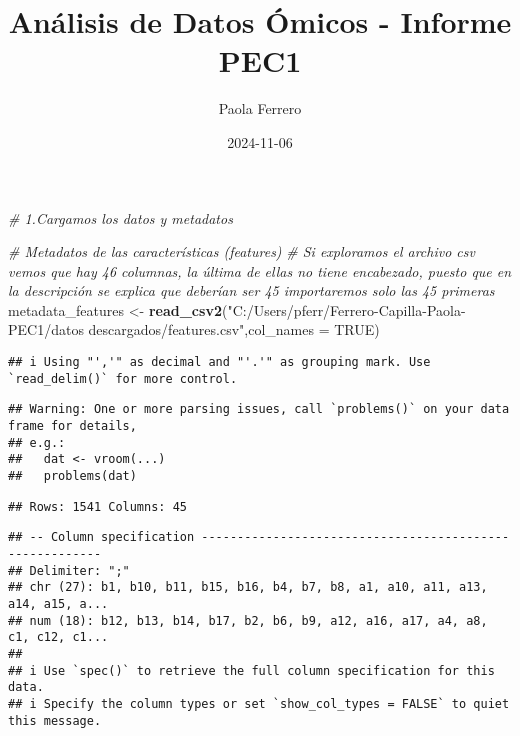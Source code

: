 \documentclass[
]{article}
\title{Análisis de Datos Ómicos - Informe PEC1}
\author{Paola Ferrero}
\date{2024-11-06}
\newenvironment{Shaded}{\begin{snugshade}}{\end{snugshade}}
\newcommand{\AttributeTok}[1]{\textcolor[rgb]{0.13,0.29,0.53}{#1}}
\newcommand{\CommentTok}[1]{\textcolor[rgb]{0.56,0.35,0.01}{\textit{#1}}}
\newcommand{\ConstantTok}[1]{\textcolor[rgb]{0.56,0.35,0.01}{#1}}
\newcommand{\FunctionTok}[1]{\textcolor[rgb]{0.13,0.29,0.53}{\textbf{#1}}}
\newcommand{\NormalTok}[1]{#1}
\newcommand{\OtherTok}[1]{\textcolor[rgb]{0.56,0.35,0.01}{#1}}
\newcommand{\StringTok}[1]{\textcolor[rgb]{0.31,0.60,0.02}{#1}}
\begin{document}
\maketitle

{
\setcounter{tocdepth}{2}
\tableofcontents
}
\begin{Shaded}
\begin{Highlighting}[]
\CommentTok{\# 1.Cargamos los datos y metadatos}

\CommentTok{\# Metadatos de las características (features)}
\CommentTok{\# Si exploramos el archivo csv vemos que hay 46 columnas, la última de ellas no tiene encabezado, puesto que en la descripción se explica que deberían ser 45 importaremos solo las 45 primeras}
\NormalTok{metadata\_features }\OtherTok{\textless{}{-}} \FunctionTok{read\_csv2}\NormalTok{(}\StringTok{"C:/Users/pferr/Ferrero{-}Capilla{-}Paola{-}PEC1/datos descargados/features.csv"}\NormalTok{,}\AttributeTok{col\_names =} \ConstantTok{TRUE}\NormalTok{)}
\end{Highlighting}
\end{Shaded}

\begin{verbatim}
## i Using "','" as decimal and "'.'" as grouping mark. Use `read_delim()` for more control.
\end{verbatim}

\begin{verbatim}
## Warning: One or more parsing issues, call `problems()` on your data frame for details,
## e.g.:
##   dat <- vroom(...)
##   problems(dat)
\end{verbatim}

\begin{verbatim}
## Rows: 1541 Columns: 45
\end{verbatim}

\begin{verbatim}
## -- Column specification --------------------------------------------------------
## Delimiter: ";"
## chr (27): b1, b10, b11, b15, b16, b4, b7, b8, a1, a10, a11, a13, a14, a15, a...
## num (18): b12, b13, b14, b17, b2, b6, b9, a12, a16, a17, a4, a8, c1, c12, c1...
## 
## i Use `spec()` to retrieve the full column specification for this data.
## i Specify the column types or set `show_col_types = FALSE` to quiet this message.
\end{verbatim}
\end{document}
